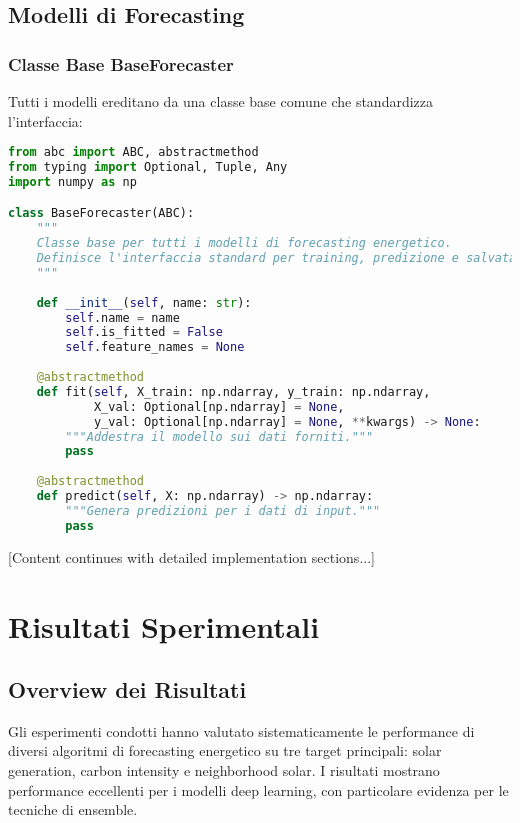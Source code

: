 \documentclass[12pt,a4paper,twoside]{report}
\begin{document}
\section{Modelli di Forecasting}

\subsection{Classe Base BaseForecaster}

Tutti i modelli ereditano da una classe base comune che standardizza l'interfaccia:

\begin{lstlisting}[language=Python]
from abc import ABC, abstractmethod
from typing import Optional, Tuple, Any
import numpy as np

class BaseForecaster(ABC):
    """
    Classe base per tutti i modelli di forecasting energetico.
    Definisce l'interfaccia standard per training, predizione e salvataggio.
    """
    
    def __init__(self, name: str):
        self.name = name
        self.is_fitted = False
        self.feature_names = None
    
    @abstractmethod
    def fit(self, X_train: np.ndarray, y_train: np.ndarray, 
            X_val: Optional[np.ndarray] = None, 
            y_val: Optional[np.ndarray] = None, **kwargs) -> None:
        """Addestra il modello sui dati forniti."""
        pass
    
    @abstractmethod  
    def predict(self, X: np.ndarray) -> np.ndarray:
        """Genera predizioni per i dati di input."""
        pass
\end{lstlisting}

[Content continues with detailed implementation sections...]


\chapter{Risultati Sperimentali}

\section{Overview dei Risultati}

Gli esperimenti condotti hanno valutato sistematicamente le performance di diversi algoritmi di forecasting energetico su tre target principali: solar generation, carbon intensity e neighborhood solar. I risultati mostrano performance eccellenti per i modelli deep learning, con particolare evidenza per le tecniche di ensemble.
\end{document}
